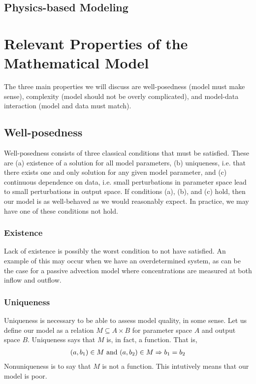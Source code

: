 \subsection{Physics-based Modeling}

\section{Relevant Properties of the Mathematical Model}
The three main properties we will discuss are well-posedness (model must make sense), complexity (model should not be overly complicated), and model-data interaction (model and data must match).
\subsection{Well-posedness}
Well-posedness consists of three classical conditions that must be satisfied. These are (a) existence of a solution for all model parameters, (b) uniqueness, i.e. that there exists one and only solution for any given model parameter, and (c) continuous dependence on data, i.e. small perturbations in parameter space lead to small perturbations in output space. If conditions (a), (b), and (c) hold, then our model is as well-behaved as we would reasonably expect. In practice, we may have one of these conditions not hold. 
\subsubsection{Existence}
Lack of existence is possibly the worst condition to not have satisfied. An example of this may occur when we have an overdetermined system, as can be the case for a passive advection model where concentrations are measured at both inflow and outflow.
\subsubsection{Uniqueness}
Uniqueness is necessary to be able to assess model quality, in some sense. Let us define our model as a relation $M \subseteq A \times B$ for parameter space $A$ and output space $B$. Uniqueness says that $M$ is, in fact, a function. That is,
\begin{align*}
    (a,b_1) \in M \textup{ and } (a,b_2) \in M \Rightarrow b_1 = b_2
\end{align*} 
Nonuniqueness is to say that $M$ is not a function. This intutively means that our model is poor.
